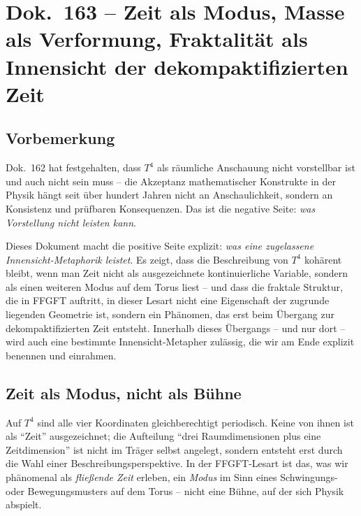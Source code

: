 
\chapter*{Dok.~163 -- Zeit als Modus, Masse als Verformung, Fraktalität als Innensicht der dekompaktifizierten Zeit}

\section*{Vorbemerkung}

Dok.~162 hat festgehalten, dass $T^4$ als räumliche Anschauung nicht
vorstellbar ist und auch nicht sein muss -- die Akzeptanz mathematischer
Konstrukte in der Physik hängt seit über hundert Jahren nicht an
Anschaulichkeit, sondern an Konsistenz und prüfbaren Konsequenzen. Das
ist die negative Seite: \emph{was Vorstellung nicht leisten kann}.

Dieses Dokument macht die positive Seite explizit: \emph{was eine
zugelassene Innensicht-Metaphorik leistet}. Es zeigt, dass die
Beschreibung von $T^4$ kohärent bleibt, wenn man Zeit nicht als
ausgezeichnete kontinuierliche Variable, sondern als einen weiteren
Modus auf dem Torus liest -- und dass die fraktale Struktur, die in
FFGFT auftritt, in dieser Lesart nicht eine Eigenschaft der zugrunde
liegenden Geometrie ist, sondern ein Phänomen, das erst beim Übergang
zur dekompaktifizierten Zeit entsteht. Innerhalb dieses Übergangs --
und nur dort -- wird auch eine bestimmte Innensicht-Metapher
zulässig, die wir am Ende explizit benennen und einrahmen.

\section{Zeit als Modus, nicht als Bühne}

Auf $T^4$ sind alle vier Koordinaten gleichberechtigt periodisch.
Keine von ihnen ist als \enquote{Zeit} ausgezeichnet; die Aufteilung
\enquote{drei Raumdimensionen plus eine Zeitdimension} ist nicht im
Träger selbst angelegt, sondern entsteht erst durch die Wahl einer
Beschreibungsperspektive. In der FFGFT-Lesart ist das, was wir
phänomenal als \emph{fließende Zeit} erleben, ein \emph{Modus} im Sinn
eines Schwingungs- oder Bewegungsmusters auf dem Torus -- nicht eine
Bühne, auf der sich Physik abspielt.


